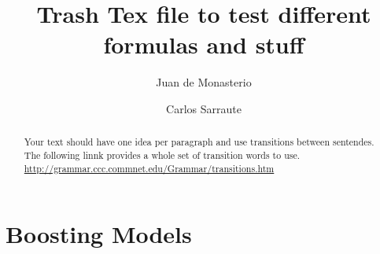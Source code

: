 \documentclass{article}%
\newcommand{\Expect}{{\mathbb{E}}}
\newtheorem{definition}{Definition}[subsection]
\theoremstyle{definition}
\begin{document}
\title{Trash Tex file to test different formulas and stuff}




\author{
	Juan de Monasterio
	\and Carlos Sarraute
}

%
%


\maketitle
\begin{abstract}
	Your text should have one idea per paragraph and use transitions between sentendes. The following linnk provides a whole set of transition words to use.
	\url{http://grammar.ccc.commnet.edu/Grammar/transitions.htm}
	
	



\end{abstract} 



\section{Boosting Models}\label{section-boosting}
\end{document}
